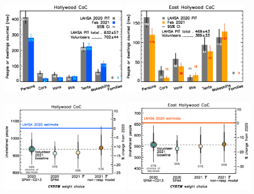 \documentclass[11pt]{article}
\begin{document}
\begin{figure}[h]
	\centering
	\includegraphics[width = 0.47\textwidth, trim = 1cm 0cm 0cm 0cm]{Hwood2021Bars}
	\includegraphics[width = 0.47\textwidth, trim = 1cm 0cm 0cm 0cm]{Eho2021Bars}
	\caption{}
	\label{fig:rawCounts}
\end{figure}

\begin{figure}[]
	\centering
	\includegraphics[width = 0.48\textwidth, trim = 1cm 0cm 0cm 1cm]{hwoodFinal}
	\includegraphics[width = 0.48\textwidth, trim = 1cm 0cm 0cm 1cm]{ehoFinal}
	\caption{}
	\label{fig:tcomp}
\end{figure}
\end{document}
